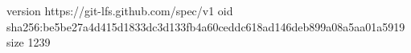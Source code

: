 version https://git-lfs.github.com/spec/v1
oid sha256:be5be27a4d415d1833dc3d133fb4a60ceddc618ad146deb899a08a5aa01a5919
size 1239
